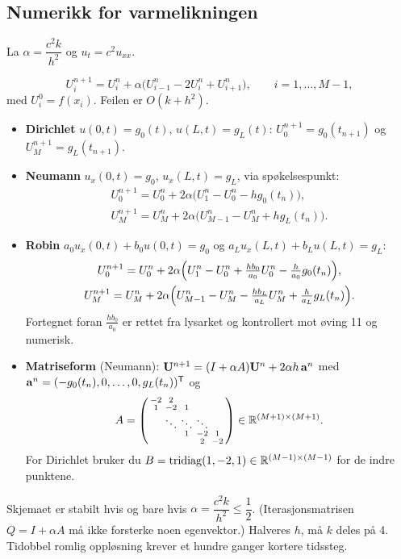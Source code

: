 \subsection{Numerikk for varmelikningen}
La $\alpha=\dfrac{c^2k}{h^2}$ og $u_t=c^2u_{xx}$.
\begin{formel}
\[
U_i^{n+1}=U_i^n+\alpha\bigl(U_{i-1}^n-2U_i^n+U_{i+1}^n\bigr),\qquad i=1,\dots,M-1,
\]
med $U_i^0=f(x_i)$. Feilen er $O(k+h^2)$.
\begin{itemize}
  \item \textbf{Dirichlet} $u(0,t)=g_0(t)$, $u(L,t)=g_L(t)$: $U_0^{n+1}=g_0(t_{n+1})$ og $U_M^{n+1}=g_L(t_{n+1})$.
  \item \textbf{Neumann} $u_x(0,t)=g_0$, $u_x(L,t)=g_L$, via spøkelsespunkt:
  \begin{gather*}
  U_0^{n+1}=U_0^n+2\alpha\bigl(U_1^n-U_0^n-hg_0(t_n)\bigr),\\ U_M^{n+1}=U_M^n+2\alpha\bigl(U_{M-1}^n-U_M^n+hg_L(t_n)\bigr).
  \end{gather*}
  \item \textbf{Robin} $a_0u_x(0,t)+b_0u(0,t)=g_0$ og $a_Lu_x(L,t)+b_Lu(L,t)=g_L$:
  \begin{gather*}
  U_0^{n+1}=U_0^n+2\alpha\Bigl(U_1^n-U_0^n+\tfrac{hb_0}{a_0}U_0^n-\tfrac h{a_0}g_0(t_n)\Bigr),\\
  U_M^{n+1}=U_M^n+2\alpha\Bigl(U_{M-1}^n-U_M^n-\tfrac{hb_L}{a_L}U_M^n+\tfrac h{a_L}g_L(t_n)\Bigr).
  \end{gather*}
  Fortegnet foran $\frac{hb_0}{a_0}$ er rettet fra lysarket og kontrollert mot øving 11 og numerisk.
  \item \textbf{Matriseform} (Neumann): $\mathbf{U}^{n+1}=(I+\alpha A)\mathbf{U}^n+2\alpha h\,\mathbf{a}^n$ med $\mathbf{a}^n=(-g_0(t_n),0,\dots,0,g_L(t_n))^{\mathsf{T}}$ og
  \[
  A=\begin{psmallmatrix}-2&2&&&\\1&-2&1&&\\&\ddots&\ddots&\ddots&\\&&1&-2&1\\&&&2&-2\end{psmallmatrix}\in\mathbb{R}^{(M+1)\times(M+1)}.
  \]
  For Dirichlet bruker du $B=\mathrm{tridiag}(1,-2,1)\in\mathbb{R}^{(M-1)\times(M-1)}$ for de indre punktene.
\end{itemize}
\end{formel}
\begin{teorem}
Skjemaet er stabilt hvis og bare hvis $\alpha=\dfrac{c^2k}{h^2}\le\dfrac12$. (Iterasjonsmatrisen $Q=I+\alpha A$ må ikke forsterke noen egenvektor.) Halveres $h$, må $k$ deles på 4. Tidobbel romlig oppløsning krever et hundre ganger kortere tidssteg.
\end{teorem}

